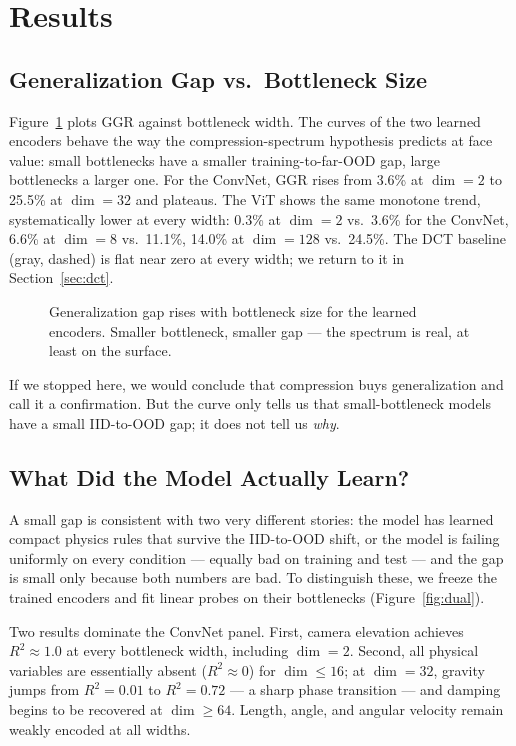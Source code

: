 \documentclass[letterpaper]{article} %
\begin{document}
\section{Results}

\subsection{Generalization Gap vs.\ Bottleneck Size}
\label{sec:money}

Figure~\ref{fig:money} plots GGR against bottleneck width. The curves of the two learned encoders behave the way the compression-spectrum hypothesis predicts at face value: small bottlenecks have a smaller training-to-far-OOD gap, large bottlenecks a larger one. For the ConvNet, GGR rises from 3.6\% at $\dim=2$ to 25.5\% at $\dim=32$ and plateaus. The ViT shows the same monotone trend, systematically lower at every width: 0.3\% at $\dim=2$ vs.\ 3.6\% for the ConvNet, 6.6\% at $\dim=8$ vs.\ 11.1\%, 14.0\% at $\dim=128$ vs.\ 24.5\%. The DCT baseline (gray, dashed) is flat near zero at every width; we return to it in Section~\ref{sec:dct}.
\begin{figure}[t]
    \centering
    
    \caption{Generalization gap rises with bottleneck size for the learned
    encoders. Smaller bottleneck, smaller gap --- the spectrum is real, at least
    on the surface.}
    \label{fig:money}
\end{figure}

If we stopped here, we would conclude that compression buys generalization and call it a confirmation. But the curve only tells us that small-bottleneck models have a small IID-to-OOD gap; it does not tell us \emph{why}.

\subsection{What Did the Model Actually Learn?}
\label{sec:probe}

A small gap is consistent with two very different stories: the model has learned compact physics rules that survive the IID-to-OOD shift, or the model is failing uniformly on every condition --- equally bad on training and test --- and the gap is small only because both numbers are bad. To distinguish these, we freeze the trained encoders and fit linear probes on their bottlenecks (Figure~\ref{fig:dual}).

Two results dominate the ConvNet panel. First, camera elevation achieves $R^2 \approx 1.0$ at every bottleneck width, including $\dim{=}2$. Second, all physical variables are essentially absent ($R^2 \approx 0$) for $\dim \le 16$; at $\dim{=}32$, gravity jumps from $R^2{=}0.01$ to $R^2{=}0.72$ --- a sharp phase transition --- and damping begins to be recovered at $\dim \ge 64$. Length, angle, and angular velocity remain weakly encoded at all widths.
\end{document}
